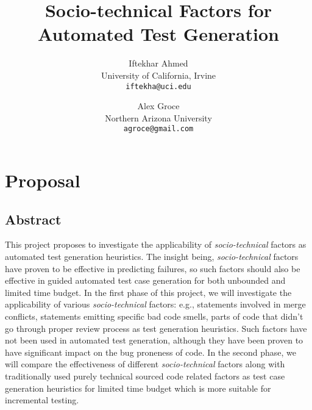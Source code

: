 \documentclass[10pt]{article}
\title{Socio-technical Factors for Automated Test Generation \vspace{-2ex}}
\author{
  Iftekhar Ahmed\\
  University of California, Irvine\\
  \texttt{iftekha@uci.edu} \vspace{-5ex}
  \and
  Alex Groce\\
  Northern Arizona University\\
  \texttt{agroce@gmail.com}\vspace{-5ex}
}
\date{}
\begin{document}
\maketitle

\section{Proposal}

\subsection{Abstract}

This project proposes to investigate the applicability of \emph{socio-technical} factors as automated test generation heuristics. The  insight being, \emph{socio-technical} factors have proven to be effective in predicting failures, so such factors should also be effective in guided automated test case generation for both unbounded and limited time budget. In the first phase of this project, we will investigate the applicability of various \emph{socio-technical} factors: e.g., statements involved in merge conflicts, statements emitting specific bad code smells, parts of code that didn't go through proper review process as test generation heuristics. Such factors have not been used in automated test generation, although they have been proven to have significant impact on the bug proneness of code. In the second phase, we will compare the effectiveness of different \emph{socio-technical} factors along with traditionally used purely technical sourced code related factors as test case generation heuristics for limited time budget which is more suitable for incremental testing.
\end{document}
